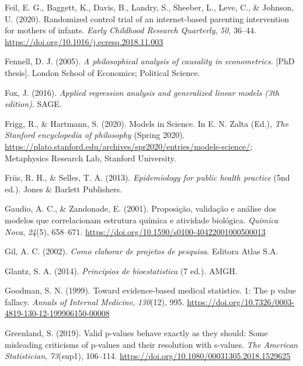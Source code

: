 \documentclass[
]{book}
\begin{document}
\leavevmode\hypertarget{ref-Feil2020}{}%
Feil, E. G., Baggett, K., Davis, B., Landry, S., Sheeber, L., Leve, C.,
\& Johnson, U. (2020). Randomized control trial of an internet-based
parenting intervention for mothers of infants. \emph{Early Childhood
Research Quarterly}, \emph{50}, 36--44.
\url{https://doi.org/10.1016/j.ecresq.2018.11.003}

\leavevmode\hypertarget{ref-Fennell2005}{}%
Fennell, D. J. (2005). \emph{A philosophical analysis of causality in
econometrics.} {[}PhD thesis{]}. London School of Economics; Political
Science.

\leavevmode\hypertarget{ref-fox2016}{}%
Fox, J. (2016). \emph{Applied regression analysis and generalized linear
models (3th edition)}. SAGE.

\leavevmode\hypertarget{ref-Firgg2020}{}%
Frigg, R., \& Hartmann, S. (2020). Models in Science. In E. N. Zalta
(Ed.), \emph{The Stanford encyclopedia of philosophy} (Spring 2020).
\url{https://plato.stanford.edu/archives/spr2020/entries/models-science/};
Metaphysics Research Lab, Stanford University.

\leavevmode\hypertarget{ref-friis2013}{}%
Friis, R. H., \& Selles, T. A. (2013). \emph{Epidemiology for public
health practice} (5nd ed.). Jones \& Barlett Publishers.

\leavevmode\hypertarget{ref-Gaudio2001}{}%
Gaudio, A. C., \& Zandonade, E. (2001). Proposição, validação e análise
dos modelos que correlacionam estrutura química e atividade biológica.
\emph{Quimica Nova}, \emph{24}(5), 658--671.
\url{https://doi.org/10.1590/s0100-40422001000500013}

\leavevmode\hypertarget{ref-gil2002}{}%
Gil, A. C. (2002). \emph{Como elaborar de projetos de pesquisa}. Editora
Atlas S.A.

\leavevmode\hypertarget{ref-glantz2014}{}%
Glantz, S. A. (2014). \emph{Principios de bioestatistica} (7 ed.). AMGH.

\leavevmode\hypertarget{ref-Goodman1999}{}%
Goodman, S. N. (1999). Toward evidence-based medical statistics. 1: The
p value fallacy. \emph{Annals of Internal Medicine}, \emph{130}(12),
995. \url{https://doi.org/10.7326/0003-4819-130-12-199906150-00008}

\leavevmode\hypertarget{ref-Greenland2019}{}%
Greenland, S. (2019). Valid p-values behave exactly as they should: Some
misleading criticisms of p-values and their resolution with s-values.
\emph{The American Statistician}, \emph{73}(sup1), 106--114.
\url{https://doi.org/10.1080/00031305.2018.1529625}
\end{document}
